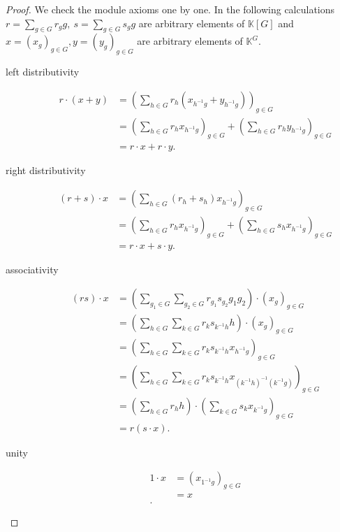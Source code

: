 \documentclass[titlepage, a4paper]{article}
\theoremstyle{remark}
\begin{document}
	\begin{proof}
		We check the module axioms one by one.
		In the following calculations $r = \sum_{g \in G}^{} r_g g,\ s = \sum_{g \in G}^{} s_g g$ are arbitrary elements of $\mathbb{K}[G]$ and $x = (x_g)_{g \in G}, y = (y_g)_{g \in G}$ are arbitrary elements of $\mathbb{K}^{G}$.
		\begin{description}
			\item[left distributivity] 
				\begin{align*}
					r\cdot (x+y) &= \left( \sum_{h \in G} r_h (x_{h^{-1} g} + y_{h^{-1} g}) \right)_{g \in G} \\
						     &= \left( \sum_{h \in G} r_h x_{h^{-1} g} \right)_{g \in G}  + \left( \sum_{h \in G} r_h y_{h^{-1}g} \right)_{g \in G}  \\
						     &= r\cdot x + r\cdot y 
				.\end{align*}
			\item[right distributivity]
				\begin{align*}
					(r + s)\cdot x &= \left( \sum_{h \in G} (r_h + s_h) x_{h^{-1} g} \right)_{g \in G}  \\
						       &= \left( \sum_{h \in G} r_h x_{h^{-1}g} \right)_{g \in G} + \left( \sum_{h \in G} s_{h} x_{h^{-1}g}  \right)_{g \in G} \\ 
						       &= r\cdot x + s \cdot y 
				.\end{align*}
		
			\item[associativity]
				 \begin{align*}
					 (rs)\cdot x &= \left( \sum_{g_1 \in G} \sum_{g_2 \in G} r_{g_1} s_{g_2} g_1 g_2 \right) \cdot (x_{g})_{g \in G} \\
						     &= \left( \sum_{h \in G} \sum_{k \in G} r_{k}s_{k^{-1}h} h\right) \cdot  \left( x_{g} \right)_{g \in G} \\
						     &= \left( \sum_{h \in G} \sum_{k \in G} r_k s_{k^{-1}h} x_{h^{-1}g} \right)_{g \in G}  \\
						     &= \left( \sum_{h \in G} \sum_{k \in G} r_k s_{k^{-1}h} x_{(k^{-1} h)^{-1}(k^{-1}g)} \right)_{g \in G}  \\
						     &= \left(\sum_{h \in G} r_h h\right) \cdot  \left( \sum_{k \in G} s_{k} x_{k^{-1}g} \right)_{g \in G} \\
						     &= r(s\cdot x) 
				.\end{align*}
			\item[unity]
				\begin{align*}
					1\cdot x &= (x_{1^{-1} g})_{g \in G} \\
						 &= x\\
				.\end{align*}
		\end{description}
	\end{proof}
\end{document}
